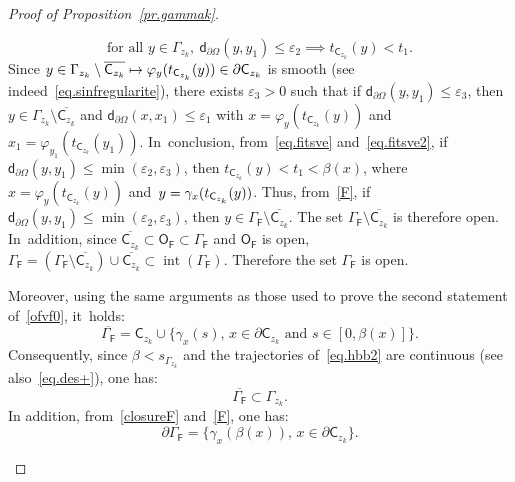 \documentclass[JEP,XML,SOM,Unicode,NoEqCountersInSection,NoFloatCountersInSection,published]{cedram}
\newcommand\mto{\mathchoice{\longmapsto}{\mapsto}{\mapsto}{\mapsto}}
\DeclareMathOperator{\inte}{int}
\let\pa\partial
\let\ve\varepsilon
\theoremstyle{plain}
\theoremstyle{definition}
\begin{document}
\begin{proof}[Proof of Proposition~\ref{pr.gammak}]
\begin{enumerate}
\begin{equation}
\text{for all } y\in \Gamma_{z_k},\ \mathsf d_{\partial \Omega}\left(y,y_1\right)\leq \ve_2 \implies t_{\mathsf C_{z_k}}(y)<t_1.
\end{equation}
Since $y\in \Gamma_{z_k}\setminus \overline{\mathsf C_{z_k}}\mto \varphi_{y}(t_{\mathsf C_{z_k}}(y))\in \pa \mathsf C_{z_k}$ is smooth (see indeed~\eqref{eq.sinfregularite}), there exists $\ve_3>0$ such that if $\mathsf d_{\partial \Omega}\left(y,y_1\right)\le \ve_3$, then $y\in \Gamma_{z_k}\setminus \overline{\mathsf C_{z_k}} $ and $\mathsf d_{\partial \Omega}(x,x_1)\le \ve_1$ with $x=\varphi_{y}(t_{\mathsf C_{z_k}}(y))$ and $x_1=\varphi_{y_1}(t_{\mathsf C_{z_k}}(y_1))$. In~conclusion, from~\eqref{eq.fitsve} and~\eqref{eq.fitsve2}, if $\mathsf d_{\partial \Omega}\left(y,y_1\right)\le \min(\ve_2,\ve_3)$, then $t_{\mathsf C_{z_k}}(y)<t_1<\beta(x)$, where $x=\varphi_{y}(t_{\mathsf C_{z_k}}(y))$ and~$y=\nobreak\gamma_x(t_{\mathsf C_{z_k}}(y))$. Thus, from~\eqref{F}, if
$\mathsf d_{\partial \Omega}\left(y,y_1\right)\le \min(\ve_2,\ve_3)$, then
$y\in \Gamma_{\mathsf F}\setminus \overline{ \mathsf C_{z_k}}$. The set $\Gamma_{\mathsf F}\setminus \overline{ \mathsf C_{z_k}}$ is therefore open. In~addition, since $\overline{\mathsf C_{z_k}}\subset \mathsf O_{\mathsf F}\subset \Gamma_{\mathsf F}$ and $ \mathsf O_{\mathsf F}$ is open, $\Gamma_{\mathsf F}=(\Gamma_{\mathsf F}\setminus \overline {\mathsf C_{z_k}})\cup \overline{\mathsf C_{z_k}}\subset\inte(\Gamma_{\mathsf F})$. Therefore the set $\Gamma_{\mathsf F}$ is open.

Moreover, using the same arguments as those used to prove the second statement of~\eqref{ofvf0}, it~holds:
\begin{equation}\label{closureF}
\overline{ \Gamma_{\mathsf F}}= \mathsf C_{z_k} \cup \big \{ \gamma_x(s), \, x\in \pa \mathsf C_{z_k} \text{ and } s\in [0,\beta(x)]\big \}.
\end{equation}
Consequently, since $\beta< s_{\Gamma_{z_k}}$ and the trajectories of~\eqref{eq.hbb2} are continuous (see also~\eqref{eq.des+}), one has:
\[
\overline{ \Gamma_{\mathsf F}}\subset \Gamma_{z_k}.
\]
In addition, from~\eqref{closureF} and~\eqref{F}, one has:
\begin{equation}\label{boundaryF}
\pa \Gamma_{\mathsf F}=\big \{ \gamma_x(\beta(x)), \, x\in \pa \mathsf C_{z_k} \big \}.
\end{equation}


\end{enumerate}
\end{proof}
\end{document}
